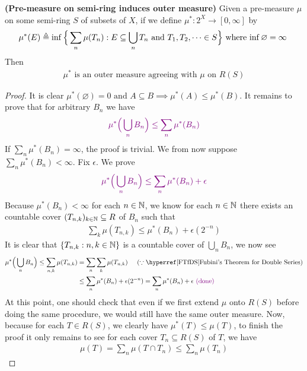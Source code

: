 \documentclass{report}
\begin{document}
\begin{theorem}
\label{Piom}
\textbf{(Pre-measure on semi-ring induces outer measure)} Given a pre-measure $\mu$ on some semi-ring $S$ of subsets of $X$, if we define $\mu^*:2^X\rightarrow [0,\infty]$ by
\begin{align*}
\mu^*(E)\triangleq \inf \Big\{ \sum_n \mu (T_n):E \subseteq \bigcup _n T_n\text{ and }T_1,T_2,\dots \in S \Big\}\text{ where $\inf \varnothing= \infty$ }
\end{align*}
Then 
\begin{align*}
  \mu^*\text{ is an outer measure agreeing with $\mu$ on $R(S)$}
\end{align*}
\end{theorem}
\begin{proof}
  It is clear $\mu^*(\varnothing)=0\text{ and }A\subseteq B \implies \mu^*(A)\leq \mu^*(B)$. It remains to prove that for arbitrary $B_n$ we have 
\begin{align*}
  \textcolor{violet}{\mu^* \Big(\bigcup_n B_n \Big)  \leq \sum_n \mu^* (B_n)}
\end{align*}
If  $\sum_n \mu^*(B_n)=\infty$, the proof is trivial. We from now suppose $\sum_n \mu^*(B_n)< \infty$. Fix $\epsilon $. We prove 
\begin{align*}
  \textcolor{violet}{\mu^*\Big(\bigcup _n B_n \Big)\leq \sum_n \mu^* (B_n)+\epsilon }
\end{align*}
Because $\mu^*(B_n)<\infty$ for each $n\in\mathbb{N}$, we know for each $n\in\mathbb{N}$ there exists an countable cover $(T_{n,k})_{k\in\mathbb{N}}\subseteq R$ of $B_n$ such that 
\begin{align*}
\sum_k \mu (T_{n,k}) \leq \mu^*(B_n)+\epsilon (2^{-n}) 
\end{align*}
It is clear that  $\{ T_{n,k}:n,k \in\mathbb{N} \}$ is a countable cover of $\bigcup_n B_n$, we now see 
\begin{align*}
  \mu^*\Big(\bigcup_n B_n \Big)\leq  \sum_{n,k} \mu (T_{n,k})&= \sum_n \sum_k \mu(T_{n,k})\hspace{0.5cm}(\because \text{\customref{FTfDS}{Fubini's Theorem for Double Series}})\\
&\leq \sum_n \mu^*(B_n)+ \epsilon (2^{-n})= \sum_n \mu^*(B_n)+ \epsilon \vdone
\end{align*}
At this point, one should check that even if we first extend $\mu$ onto $R(S)$ before doing the same procedure, we would still have the same outer measure. Now, because for each $T \in R(S)$, we clearly have $\mu^*(T)\leq \mu (T)$, to finish the proof it only remains to see for each cover $T_n \subseteq R(S)$ of $T$, we have
\begin{align*}
\mu (T)=\sum_n \mu (T\cap T_n)\leq \sum_n \mu (T_n)
\end{align*}
\end{proof}
\end{document}
